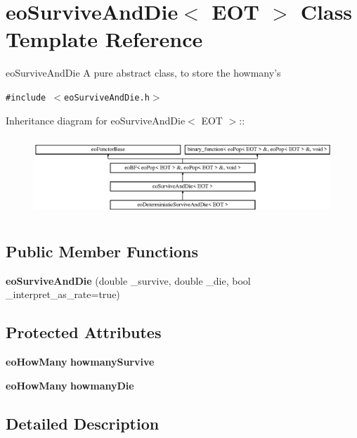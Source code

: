 \section{eo\-Survive\-And\-Die$<$ EOT $>$ Class Template Reference}
\label{classeo_survive_and_die}
eo\-Survive\-And\-Die A pure abstract class, to store the howmany's  


{\tt \#include $<$eo\-Survive\-And\-Die.h$>$}

Inheritance diagram for eo\-Survive\-And\-Die$<$ EOT $>$::\begin{figure}[H]
\begin{center}
\leavevmode
\includegraphics[height=3.01075cm]{classeo_survive_and_die}
\end{center}
\end{figure}
\subsection*{Public Member Functions}
\begin{CompactItemize}
\item 
{\bf eo\-Survive\-And\-Die} (double \_\-survive, double \_\-die, bool \_\-interpret\_\-as\_\-rate=true)\label{classeo_survive_and_die_a0}

\end{CompactItemize}
\subsection*{Protected Attributes}
\begin{CompactItemize}
\item 
{\bf eo\-How\-Many} {\bf howmany\-Survive}\label{classeo_survive_and_die_p0}

\item 
{\bf eo\-How\-Many} {\bf howmany\-Die}\label{classeo_survive_and_die_p1}

\end{CompactItemize}


\subsection{Detailed Description}
